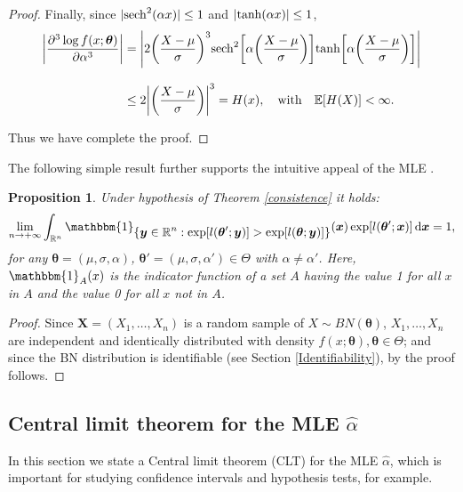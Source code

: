 \documentclass[12pt]{article}
\newtheorem{proposition}[theorem]{Proposition}
\theoremstyle{definition}
\begin{document}
\begin{proof}
Finally, since $\vert{\rm sech}^2(\alpha x)\vert \leq 1$ and $\vert{\rm tanh}(\alpha x)\vert\leq 1$, 
\begin{align}\label{3condition}
\biggl\vert{\partial^3 \log f(x;\boldsymbol{\theta})\over \partial \alpha^3 }\biggr\vert
&=
\Biggl\vert 
2\biggl({X-\mu\over \sigma}\biggr)^3{\rm sech}^2\biggl[\alpha\biggl({X-\mu\over \sigma}\biggr)\biggr] {\rm tanh}\biggl[\alpha\biggl({X-\mu\over \sigma}\biggr)\biggr]\Biggr\vert
\nonumber
\\[0,3cm]
&\leq 
2\biggl\vert \biggl({X-\mu\over \sigma}\biggr)\biggr\vert^3=H(x),
\quad \text{with} \quad \mathbb{E}[H(X)]<\infty.
\end{align}

Thus we have complete the proof.
\end{proof}

The following simple result further supports the intuitive appeal of the MLE \citep{baj:71}.
\begin{proposition}
Under hypothesis of Theorem \ref{consistence} it holds:
\begin{align*}
\lim_{n\to+\infty} 
\int_{\mathbb{R}^n} 
\mathbbm{1}_{\displaystyle\{\boldsymbol{y}\in \mathbb{R}^n: \exp[l(\boldsymbol{\theta}';\boldsymbol{y})]>\exp[l(\boldsymbol{\theta};\boldsymbol{y})]\}} (\boldsymbol{x}) \exp[l(\boldsymbol{\theta}';\boldsymbol{x})]\, 
{\rm d} \boldsymbol{x}
=1,
\end{align*} 
for any $\boldsymbol{\theta}=(\mu,\sigma,\alpha)$, $\boldsymbol{\theta}'=(\mu,\sigma,\alpha')\in\Theta$ with $\alpha\neq\alpha'$. Here, $\mathbbm{1}_A(x)$ is the indicator function of a set $A$ having the value 1 for all $x$ in $A$ and the value 0 for all $x$ not in $A$.
\end{proposition}
\begin{proof}
Since $\boldsymbol{X}=(X_1,\ldots, X_n)$ is a random sample of $X\sim BN(\boldsymbol{\theta})$,
$X_1, \ldots ,X_n$ are independent and identically distributed with density $f (x;\boldsymbol{\theta}), \boldsymbol{\theta}\in\Theta$; and since the BN distribution is identifiable (see Section \ref{Identifiability}), by \cite{baj:71} the proof follows.
\end{proof}

\subsection{Central limit theorem for the MLE $\widehat{\alpha}$}

In this section we state a Central limit theorem (CLT) for the MLE $\widehat{\alpha}$, which is important for studying confidence intervals and hypothesis tests, for example.
\end{document}
